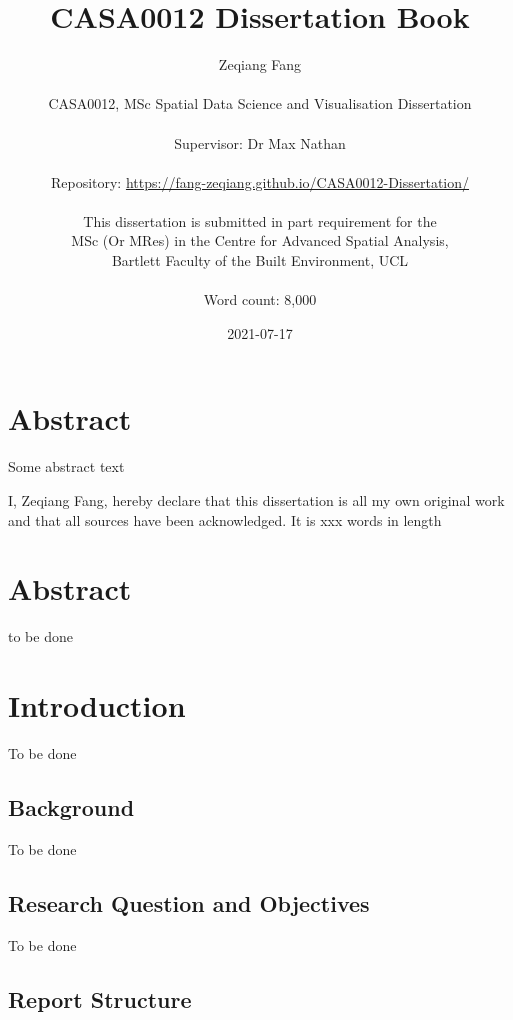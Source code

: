 \documentclass[
  12pt,
  oneside]{book}
\title{CASA0012 Dissertation Book}
\author{Zeqiang Fang\\
~\\
CASA0012, MSc Spatial Data Science and Visualisation Dissertation\\
~\\
Supervisor: Dr Max Nathan\\
~\\
Repository: \url{https://fang-zeqiang.github.io/CASA0012-Dissertation/}\\
~\\
This dissertation is submitted in part requirement for the\\
MSc (Or MRes) in the Centre for Advanced Spatial Analysis,\\
Bartlett Faculty of the Built Environment, UCL\\
~\\
Word count: 8,000}
\date{2021-07-17}
\begin{document}
\maketitle


\hypertarget{abstract}{%
\chapter*{Abstract}\label{abstract}}

Some abstract text


I, Zeqiang Fang, hereby declare that this dissertation is all my own original work and that all sources have been acknowledged. It is xxx words in length

\setcounter{tocdepth}{3}
\tableofcontents
\listoffigures
\listoftables

\hypertarget{abstract-1}{%
\chapter*{Abstract}\label{abstract-1}}

to be done

\hypertarget{introduction}{%
\chapter{Introduction}\label{introduction}}


To be done

\hypertarget{background}{%
\section{Background}\label{background}}

To be done

\hypertarget{research-question-and-objectives}{%
\section{Research Question and Objectives}\label{research-question-and-objectives}}

To be done

\hypertarget{report-structure}{%
\section{Report Structure}\label{report-structure}}
\end{document}
